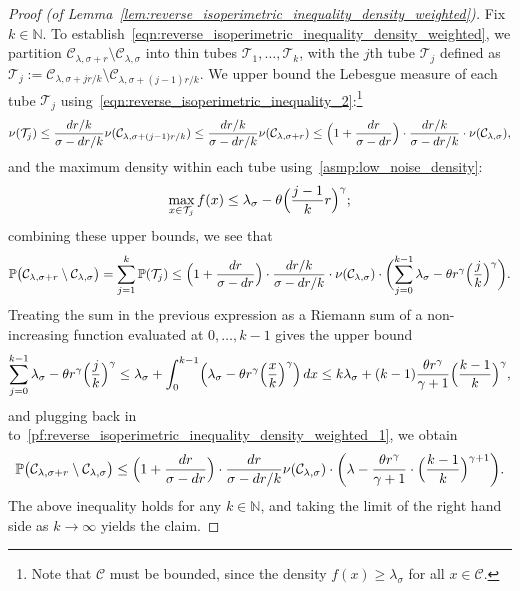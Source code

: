 \documentclass{article}
\newcommand{\1}{\mathbf{1}}
\newcommand{\mc}[1]{\mathcal{#1}}
\newcommand{\Pbb}{\mathbb{P}}
\theoremstyle{definition}
\theoremstyle{remark}
\begin{document}
\begin{proof}[Proof (of Lemma~\ref{lem:reverse_isoperimetric_inequality_density_weighted})]
	Fix $k \in \mathbb{N}$. To establish~\eqref{eqn:reverse_isoperimetric_inequality_density_weighted}, we partition $\mc{C}_{\lambda,\sigma + r} \setminus \mc{C}_{\lambda,\sigma}$ into thin tubes $\mc{T}_{1},\ldots,\mc{T}_{k}$, with the $j$th tube $\mc{T}_j$ defined as $\mc{T}_j := \mc{C}_{\lambda,\sigma + jr/k} \setminus \mc{C}_{\lambda,\sigma + (j - 1)r/k}.$ We upper bound the Lebesgue measure of each tube $\mc{T}_j$ using~\eqref{eqn:reverse_isoperimetric_inequality_2}:\footnote{Note that $\mc{C}$ must be bounded, since the density $f(x) \geq \lambda_{\sigma}$ for all $x \in \mc{C}$.}
	\begin{equation*}
	\nu(\mc{T}_j) \leq \frac{dr/k}{\sigma - dr/k} \nu(\mc{C}_{\lambda,\sigma + (j - 1)r/k}) \leq \frac{dr/k}{\sigma - dr/k} \nu(\mc{C}_{\lambda,\sigma + r}) \leq \Bigl(1 + \frac{dr}{\sigma - dr}\Bigr) \cdot \frac{dr/k}{\sigma - dr/k}  \cdot \nu(\mc{C}_{\lambda,\sigma}),
	\end{equation*}
	and the maximum density within each tube using~\ref{asmp:low_noise_density}:
	\begin{equation*}
	\max_{x \in \mc{T}_j} f(x) \leq \lambda_{\sigma} - \theta \Bigl(\frac{j - 1}{k}r\Bigr)^{\gamma};
	\end{equation*}
	combining these upper bounds, we see that
	\begin{equation}
	\label{pf:reverse_isoperimetric_inequality_density_weighted_1}
	\Pbb\bigl(\mc{C}_{\lambda,\sigma + r} \setminus \mc{C}_{\lambda,\sigma}\bigr) = \sum_{j = 1}^{k} \Pbb(\mc{T}_j) \leq \Bigl(1 + \frac{dr}{\sigma - dr}\Bigr) \cdot  \frac{dr/k}{\sigma - dr/k} \cdot \nu(\mc{C}_{\lambda,\sigma}) \cdot \biggl(\sum_{j = 0}^{k - 1}\lambda_{\sigma} -  \theta r^{\gamma} \Bigl(\frac{j}{k}\Bigr)^{\gamma} \biggr).
	\end{equation}
	Treating the sum in the previous expression as a Riemann sum of a non-increasing function evaluated at $0,\ldots,k -1$ gives the upper bound
	\begin{equation*}
	\sum_{j = 0}^{k - 1}\lambda_{\sigma} -  \theta r^{\gamma} \Bigl(\frac{j}{k}\Bigr)^{\gamma } \leq \lambda_{\sigma} + \int_{0}^{k - 1} \Bigl(\lambda_{\sigma} -  \theta r^{\gamma} \Bigl(\frac{x}{k}\Bigr)^{\gamma}\Bigr) \,dx \leq k\lambda_{\sigma} + (k - 1)\frac{\theta r^{\gamma}}{\gamma + 1} \Bigl(\frac{k - 1}{k}\Bigr)^{\gamma},
	\end{equation*}
	and plugging back in to~\eqref{pf:reverse_isoperimetric_inequality_density_weighted_1}, we obtain
	\begin{equation*}
	\Pbb\bigl(\mc{C}_{\lambda,\sigma + r} \setminus \mc{C}_{\lambda,\sigma}\bigr) \leq  \Bigl(1 + \frac{dr}{\sigma - dr}\Bigr) \cdot \frac{dr}{\sigma - dr/k} \nu(\mc{C}_{\lambda,\sigma}) \cdot \biggl(\lambda - \frac{\theta r^{\gamma}}{\gamma + 1} \cdot \Bigl(\frac{k - 1}{k}\Bigr)^{\gamma + 1} \biggl).
	\end{equation*}
	The above inequality holds for any $k \in \mathbb{N}$, and taking the limit of the right hand side as $k \to \infty$ yields the claim.
\end{proof}
\end{document}
